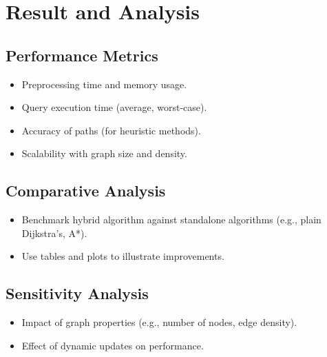 \chapter{Result and Analysis}
	
\section{Performance Metrics}
	\begin{itemize}
		\item Preprocessing time and memory usage.
		\item Query execution time (average, worst-case).
		\item Accuracy of paths (for heuristic methods).
		\item Scalability with graph size and density.
	\end{itemize}
\section{Comparative Analysis}
	\begin{itemize}
		\item Benchmark hybrid algorithm against standalone algorithms (e.g., plain Dijkstra's, A*).
		\item Use tables and plots to illustrate improvements.
	\end{itemize}
\section{Sensitivity Analysis}
	\begin{itemize}
		\item Impact of graph properties (e.g., number of nodes, edge density).
		\item Effect of dynamic updates on performance.
	\end{itemize}